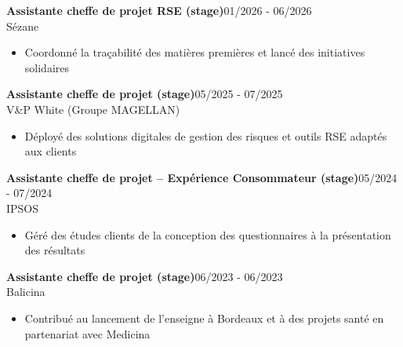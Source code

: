 \documentclass[a4paper]{article}
\renewcommand{\colorbox}[2]{#2}%
\begin{document}
\vspace{3mm}

\colorbox{maincolor}{%
  \begin{minipage}{\linewidth}
    \noindent
    \textbf{Assistante cheffe de projet RSE (stage)}\hfill 01/2026 - 06/2026\\
    Sézane\\[-0.3em]
    \begin{itemize}[leftmargin=*]
      \item Coordonné la traçabilité des matières premières et lancé des initiatives solidaires
    \end{itemize}
  \end{minipage}}

\vspace{3mm}

\colorbox{maincolor}{%
  \begin{minipage}{\linewidth}
    \noindent
    \textbf{Assistante cheffe de projet (stage)}\hfill 05/2025 - 07/2025\\
    V\&P White (Groupe MAGELLAN)\\[-0.3em]
    \begin{itemize}[leftmargin=*]
      \item Déployé des solutions digitales de gestion des risques et outils RSE adaptés aux clients
    \end{itemize}
  \end{minipage}}

\vspace{3mm}

\colorbox{maincolor}{%
  \begin{minipage}{\linewidth}
    \noindent
    \textbf{Assistante cheffe de projet – Expérience Consommateur (stage)}\hfill 05/2024 - 07/2024\\
    IPSOS\\[-0.3em]
    \begin{itemize}[leftmargin=*]
      \item Géré des études clients de la conception des questionnaires à la présentation des résultats
    \end{itemize}
  \end{minipage}}

\vspace{3mm}

\colorbox{maincolor}{%
  \begin{minipage}{\linewidth}
    \noindent
    \textbf{Assistante cheffe de projet (stage)}\hfill 06/2023 - 06/2023\\
    Balicina\\[-0.3em]
    \begin{itemize}[leftmargin=*]
      \item Contribué au lancement de l’enseigne à Bordeaux et à des projets santé en partenariat avec Medicina
    \end{itemize}
  \end{minipage}}
\end{document}
